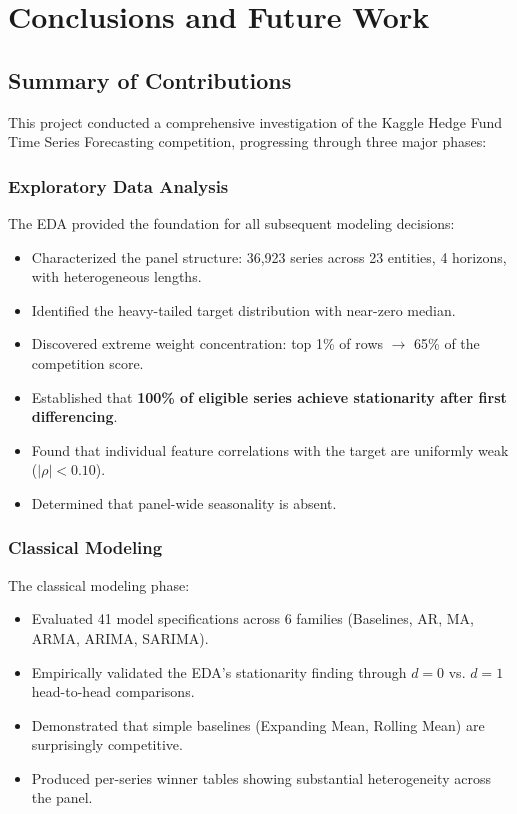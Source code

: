 \chapter{Conclusions and Future Work}
\label{ch:conclusion}

\section{Summary of Contributions}

This project conducted a comprehensive investigation of the Kaggle Hedge Fund Time Series Forecasting competition, progressing through three major phases:

\subsection{Exploratory Data Analysis}

The EDA provided the foundation for all subsequent modeling decisions:
\begin{itemize}
    \item Characterized the panel structure: 36,923 series across 23 entities, 4 horizons, with heterogeneous lengths.
    \item Identified the heavy-tailed target distribution with near-zero median.
    \item Discovered extreme weight concentration: top 1\% of rows $\to$ 65\% of the competition score.
    \item Established that \textbf{100\% of eligible series achieve stationarity after first differencing}.
    \item Found that individual feature correlations with the target are uniformly weak ($|\rho| < 0.10$).
    \item Determined that panel-wide seasonality is absent.
\end{itemize}

\subsection{Classical Modeling}

The classical modeling phase:
\begin{itemize}
    \item Evaluated 41 model specifications across 6 families (Baselines, AR, MA, ARMA, ARIMA, SARIMA).
    \item Empirically validated the EDA's stationarity finding through $d=0$ vs. $d=1$ head-to-head comparisons.
    \item Demonstrated that simple baselines (Expanding Mean, Rolling Mean) are surprisingly competitive.
    \item Produced per-series winner tables showing substantial heterogeneity across the panel.
\end{itemize}

